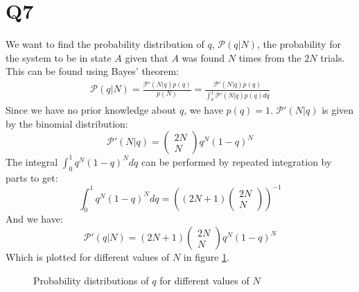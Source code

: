 \documentclass[../main.tex]{subfiles}
\begin{document}
\section*{Q7}
We want to find the probability distribution of $q$, $\mathcal{P}(q|N)$, the probability for the system to be in state $A$ given that $A$ was found $N$ times from the $2N$ trials.
This can be found using Bayes' theorem:
\begin{align}
	\mathcal{P}(q|N) = \frac{\mathcal{P}'(N|q)p(q)}{p(N)} = \frac{\mathcal{P}'(N|q)p(q)}{\int_0^1\mathcal{P}'(N|q)p(q)dq}
\end{align}
Since we have no prior knowledge about $q$, we have $p(q)=1$. $\mathcal{P}'(N|q)$ is given by the binomial distribution: 
\begin{equation}
	\mathcal{P}'(N|q)=\left(\begin{matrix}2N\\N\end{matrix}\right)q^N(1-q)^N
\end{equation}
The integral $\int_0^1q^N(1-q)^Ndq$ can be performed by repeated integration by parts to get:
\begin{equation}
	\int_0^1q^N(1-q)^Ndq = \left((2N+1)\left(\begin{matrix}2N\\N\end{matrix}\right)\right)^{-1}
\end{equation}
And we have:
\begin{equation}
	\mathcal{P}'(q|N) = (2N+1)\left(\begin{matrix}2N\\N\end{matrix}\right)q^N(1-q)^N
\end{equation}
Which is plotted for different values of $N$ in figure \ref{fig:bayes_prob_dists}.
\begin{figure}
\centering
\subfloat{
}\qquad
\caption{Probability distributions of $q$ for different values of $N$}
\label{fig:bayes_prob_dists}
\end{figure}
\end{document}
